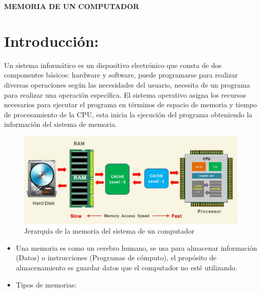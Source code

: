 \documentclass{article}
\begin{document}



\vfill

\newpage
\begin{center}
    \title{}
    \textbf{MEMORIA DE UN COMPUTADOR}    
\end{center}
\section*{Introducción:}
\begin{flushleft}
    Un sistema informático es un dispositivo electrónico que consta de dos componentes básicos: hardware y software, puede programarse para realizar diversas operaciones según las necesidades del usuario, necesita de un programa para realizar una operación específica. El sistema operativo asigna los recursos necesarios para ejecutar el programa en términos de espacio de memoria y tiempo de procesamiento de la CPU, esta inicia la ejecución del programa obteniendo la información del sistema de memoria.
    \begin{figure}[htp]
        \includegraphics{Images/Sistema de memoria.PNG}
        \caption{Jerarquía de la memoria del sistema de un computador}
        \label{hola:out}
    \end{figure}
    \begin{itemize}
        \item Una memoria es como un cerebro humano, se usa para almacenar información (Datos) o instrucciones (Programas de cómputo), el propósito de almacenamiento es guardar datos que el computador no esté utilizando.
        \item Tipos de memorias:
    \end{itemize}
\end{flushleft}
\end{document}
